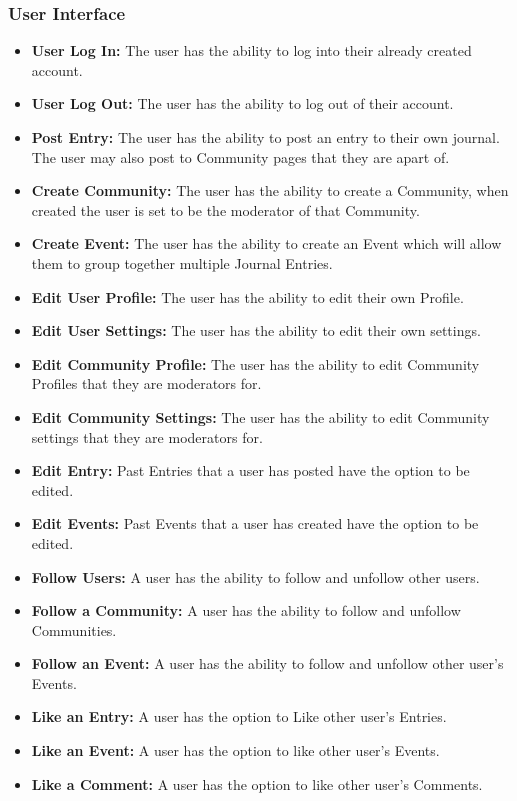 \documentclass[letterpaper, 10, draftclsnofoot, onecolumn]{IEEEtran}
\begin{document}
\subsubsection{User Interface}
\begin{itemize} 

\item \textbf{User Log In: } The user has the ability to log into their already created account.
\item \textbf{User Log Out: } The user has the ability to log out of their account.

\item \textbf{Post Entry: } The user has the ability to post an entry to their own journal. The user may also post to Community pages that they are apart of. 
 
\item \textbf{Create Community: } The user has the ability to create a Community, when created the user is set to be the moderator of that Community.
\item \textbf{Create Event: } The user has the ability to create an Event which will allow them to group together multiple Journal Entries.

\item \textbf{Edit User Profile: } The user has the ability to edit their own Profile.
\item \textbf{Edit User Settings: } The user has the ability to edit their own settings.
\item \textbf{Edit Community Profile: } The user has the ability to edit Community Profiles that they are moderators for.
\item \textbf{Edit Community Settings: } The user has the ability to edit Community settings that they are moderators for.
\item \textbf{Edit Entry: } Past Entries that a user has posted have the option to be edited.
\item \textbf{Edit Events: } Past Events that a user has created have the option to be edited.

\item \textbf{Follow Users: } A user has the ability to follow and unfollow other users.
\item \textbf{Follow a Community: } A user has the ability to follow and unfollow Communities.
\item \textbf{Follow an Event: } A user has the ability to follow and unfollow other user's Events.

\item \textbf{Like an Entry: } A user has the option to Like other user's Entries.
\item \textbf{Like an Event: } A user has the option to like other user's Events.
\item \textbf{Like a Comment: } A user has the option to like other user's Comments.


\end{itemize}
\end{document}
